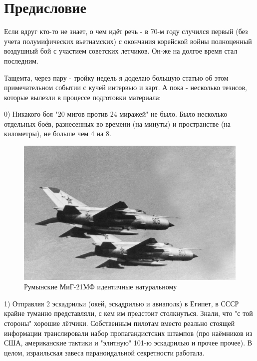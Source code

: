 \chapter{Предисловие}

Если вдруг кто-то не знает, о чем идёт речь - в 70-м году случился первый (без учета полумифических вьетнамских) с окончания корейской войны полноценный воздушный бой с участием советских летчиков. Он-же на долгое время стал последним.

Тащемта, через пару - тройку недель я доделаю большую статью об этом примечательном событии с кучей интервью и карт. А пока - несколько тезисов, которые вылезли в процессе подготовки материала:

0) Никакого боя "20 мигов против 24 миражей" не было. Было несколько отдельных боёв, разнесенных во времени (на минуты) и пространстве (на километры), не больше чем 4 на 8.

\begin{figure}[h!tb] 
	\centering\includegraphics[scale=0.4]{Dolina_0/fY6zrQ81LqI.jpg}
	\caption{Румынские МиГ-21МФ идентичные натуральному}%
\end{figure}
1) Отправляя 2 эскадрильи (окей, эскадрилью и авиаполк) в Египет, в СССР крайне туманно представляли, с кем им предстоит столкнуться. Знали, что "с той стороны" хорошие лётчики. Собственным пилотам вместо реально стоящей информации транслировали набор пропагандистских штампов (про наёмников из США, американские тактики и "элитную" 101-ю эскадрилью и прочее прочее). В целом, израильская завеса параноидальной секретности работала.

